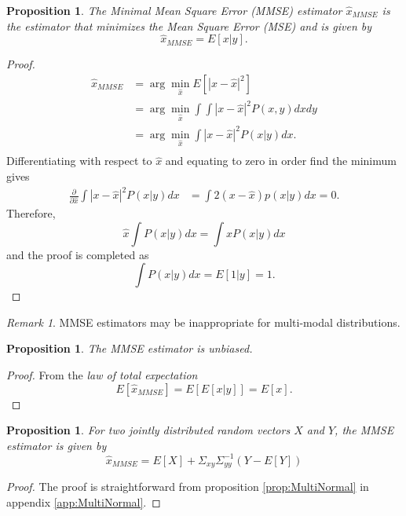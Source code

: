 \documentclass{article}
\newtheorem{prop}[thm]{Proposition}
\theoremstyle{definition}
\theoremstyle{remark}
\newtheorem{remark}[thm]{Remark}
\begin{document}
\begin{prop}
The \emph{Minimal Mean Square Error} (MMSE) estimator $\hat{x}_{MMSE}$ is the estimator that minimizes the Mean Square Error (MSE) and is given by
\begin{equation}
\hat{x}_{MMSE}=E[x|y].
\end{equation}
\end{prop}
\begin{proof}
\begin{align*}
\hat{x}_{MMSE}&=\arg\min_{\hat{x}} E[|x-\hat{x}|^2]\\
&=\arg\min_{\hat{x}} \int \int |x-{\hat{x}}|^2 P(x,y)dxdy\\
&=\arg\min_{\hat{x}} \int |x-{\hat{x}}|^2 P(x|y)dx.\\
\end{align*}
Differentiating with respect to $\hat{x}$ and equating to zero in order find the minimum gives
\begin{align*}
\frac{\partial }{\partial \hat{x}}\int |x-{\hat{x}}|^2 P(x|y)dx&=\int 2(x-{\hat{x}}) p(x|y)dx=0.
\end{align*}
Therefore,
\begin{equation*}
\hat{x} \int P(x|y)dx=\int xP(x|y)dx
\end{equation*}
and the proof is completed as
\begin{equation*}
\int P(x|y)dx=E[1|y]=1.
\end{equation*}
\end{proof}

\begin{remark}
MMSE estimators may be inappropriate for multi-modal distributions.
\end{remark}
\begin{prop}
The MMSE estimator is unbiased.
\end{prop}
\begin{proof}
From the \emph{law of total expectation}
\begin{equation*}
E[\hat{x}_{MMSE}]=E[E[x|y]]=E[x].
\end{equation*}
\end{proof}
\begin{prop}
For two jointly distributed random vectors $X$ and $Y$, the MMSE estimator is given by
\begin{equation}
\hat{x}_{MMSE}=E[X]+\Sigma_{xy}\Sigma_{yy}^{-1}(Y-E[Y])
\end{equation}
\end{prop}
\begin{proof}
The proof is straightforward from proposition \ref{prop:MultiNormal} in appendix \ref{app:MultiNormal}.
\end{proof}
\end{document}
